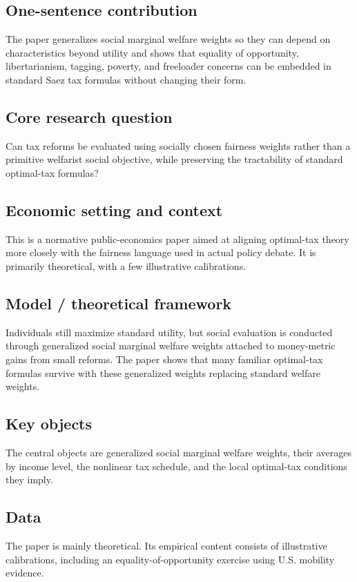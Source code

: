 \documentclass[11pt,a4paper]{article}
\begin{document}
\subsection*{One-sentence contribution}
The paper generalizes social marginal welfare weights so they can depend on characteristics beyond utility and shows that equality of opportunity, libertarianism, tagging, poverty, and freeloader concerns can be embedded in standard Saez tax formulas without changing their form.

\subsection*{Core research question}
Can tax reforms be evaluated using socially chosen fairness weights rather than a primitive welfarist social objective, while preserving the tractability of standard optimal-tax formulas?

\subsection*{Economic setting and context}
This is a normative public-economics paper aimed at aligning optimal-tax theory more closely with the fairness language used in actual policy debate. It is primarily theoretical, with a few illustrative calibrations.

\subsection*{Model / theoretical framework}
Individuals still maximize standard utility, but social evaluation is conducted through generalized social marginal welfare weights attached to money-metric gains from small reforms. The paper shows that many familiar optimal-tax formulas survive with these generalized weights replacing standard welfare weights.

\subsection*{Key objects}
The central objects are generalized social marginal welfare weights, their averages by income level, the nonlinear tax schedule, and the local optimal-tax conditions they imply.

\subsection*{Data}
The paper is mainly theoretical. Its empirical content consists of illustrative calibrations, including an equality-of-opportunity exercise using U.S. mobility evidence.
\end{document}
